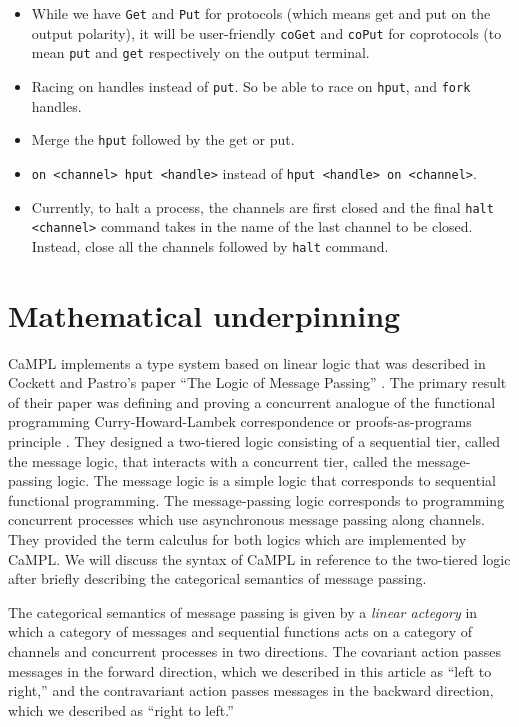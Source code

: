 \documentclass[11pt]{article}
\begin{document}
\begin{itemize}
	\item While we have \texttt{Get} and \texttt{Put} for protocols (which means get and put on the output polarity), it will be user-friendly \texttt{coGet} and \texttt{coPut} for coprotocols (to mean \texttt{put} and \texttt{get} respectively on the output terminal.
	\item Racing on handles instead of \texttt{put}. So be able to race on \texttt{hput}, and \texttt{fork} handles.
	\item Merge the \texttt{hput} followed by the get or put. 
	\item \texttt{on <channel> hput <handle>} instead of \texttt{hput <handle> on <channel>}. 
	\item Currently, to halt a process, the channels are first closed and the final \texttt{halt <channel>} command takes in the name of the last channel to be closed. Instead, close all the channels followed by \texttt{halt} command.
\end{itemize}
\fi

\section{Mathematical underpinning}
\label{Sec:math_underp}

CaMPL implements a type system based on linear logic that was described in Cockett and Pastro’s paper ``The Logic of Message Passing'' \cite{CoP07}. The primary result of their paper was defining and proving a concurrent analogue of the functional programming Curry-Howard-Lambek correspondence or proofs-as-programs principle \cite{Howard1980, Lambek1969, Lambek1972}. They designed a two-tiered logic consisting of a sequential tier, called the message logic, that interacts with a concurrent tier, called the message-passing logic. 
The message logic is a simple logic that corresponds to sequential functional programming.
The message-passing logic corresponds to programming concurrent processes which use asynchronous message passing along channels. They provided the term calculus for both logics \cite[Section 2.1, Section 3.1]{CoP07} which are implemented by CaMPL. We will discuss the syntax of CaMPL in reference to the two-tiered logic after briefly describing the categorical semantics of message passing.

The categorical semantics of message passing is given by a {\em linear actegory} in which a category of messages and sequential functions acts on a category of channels and concurrent processes in two directions.
The covariant action passes messages in the forward direction, which we described in this article as ``left to right,'' and the contravariant action passes messages in the backward direction, which we described as ``right to left.''
\end{document}
